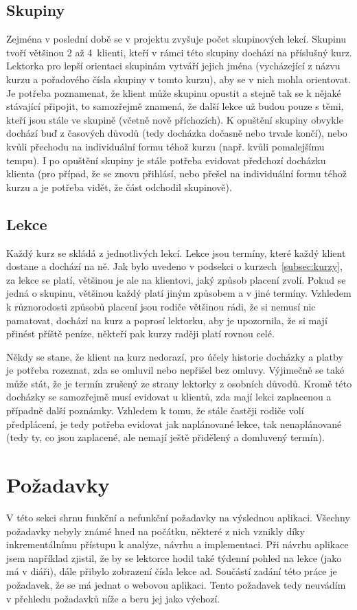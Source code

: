         \subsection{Skupiny}\label{subsec:skupiny}
        Zejména v poslední době se v projektu zvyšuje počet skupinových lekcí. Skupinu tvoří většinou 2 až 4~klienti, kteří v rámci této skupiny dochází na příslušný kurz. Lektorka pro lepší orientaci skupinám vytváří jejich jména (vycházející z názvu kurzu a pořadového čísla skupiny v tomto kurzu), aby se v nich mohla orientovat. Je potřeba poznamenat, že klient může skupinu opustit a stejně tak se k nějaké stávající připojit, to samozřejmě znamená, že další lekce už budou pouze s těmi, kteří jsou stále ve skupině (včetně nově příchozích). K opuštění skupiny obvykle dochází buď z časových důvodů (tedy docházka dočasně nebo trvale končí), nebo kvůli přechodu na individuální formu téhož kurzu (např. kvůli pomalejšímu tempu). I po opuštění skupiny je stále potřeba evidovat předchozí docházku klienta (pro případ, že se znovu přihlásí, nebo přešel na individuální formu téhož kurzu a je potřeba vidět, že část odchodil skupinově). 
        
        \subsection{Lekce}
        Každý kurz se skládá z jednotlivých lekcí. Lekce jsou termíny, které každý klient dostane a dochází na ně. Jak bylo uvedeno v podsekci o kurzech~\ref{subsec:kurzy}, za lekce se platí, většinou je ale na klientovi, jaký způsob placení zvolí. Pokud se jedná o skupinu, většinou každý platí jiným způsobem a v jiné termíny. Vzhledem k různorodosti způsobů placení jsou rodiče většinou rádi, že si nemusí nic pamatovat, dochází na kurz a poprosí lektorku, aby je upozornila, že si mají přinést příště peníze, někteří pak kurzy raději platí rovnou celé.
        
        Někdy se stane, že klient na kurz nedorazí, pro účely historie docházky a platby je potřeba rozeznat, zda se omluvil nebo nepřišel bez omluvy. Výjimečně se také může stát, že je termín zrušený ze strany lektorky z osobních důvodů. Kromě této docházky se samozřejmě musí evidovat u klientů, zda mají lekci zaplacenou a případně další poznámky. Vzhledem k tomu, že stále častěji rodiče volí předplácení, je tedy potřeba evidovat jak naplánované lekce, tak nenaplánované (tedy ty, co jsou zaplacené, ale nemají ještě přidělený a domluvený termín).
    
    \section{Požadavky}
    V této sekci shrnu funkční a nefunkční požadavky na výslednou aplikaci. Všechny požadavky nebyly známé hned na počátku, některé z nich vznikly díky inkrementálnímu přístupu k analýze, návrhu a implementaci. Při návrhu aplikace jsem například zjistil, že by se lektorce hodil také týdenní pohled na lekce (jako má v diáři), dále přibylo zobrazení čísla lekce ad. Součástí zadání této práce je požadavek, že se má jednat o webovou aplikaci. Tento požadavek tedy neuvádím v přehledu požadavků níže a beru jej jako výchozí.
    
